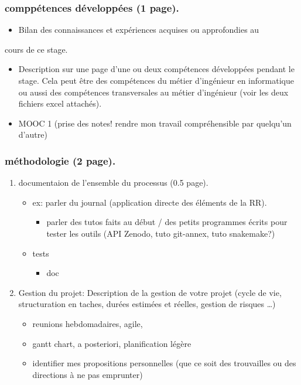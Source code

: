 \documentclass[11pt]{article}
\begin{document}
\subsubsection{comppétences développées (1 page).}
\label{sec:org7d59743}
\begin{itemize}
\item Bilan des connaissances et expériences acquises ou approfondies au
\end{itemize}
cours de ce stage.
\begin{itemize}
\item Description sur une page d'une ou deux compétences développées
pendant le stage. Cela peut être des compétences du métier
d'ingénieur en informatique ou aussi des compétences
transversales au métier d'ingénieur (voir les deux fichiers excel
attachés).
\item MOOC 1 (prise des notes! rendre mon travail compréhensible par
quelqu'un d'autre)
\end{itemize}

\subsubsection{méthodologie (2 page).}
\label{sec:orga69acbe}
\begin{enumerate}
\item documentaion de l'ensemble du processus (0.5 page).
\label{sec:orgefa5e29}
\begin{itemize}
\item ex: parler du journal (application directe des éléments de la RR).

\begin{itemize}
\item parler des tutos faits au début / des petits programmes écrits
pour tester les outils (API Zenodo, tuto git-annex, tuto
snakemake?)
\end{itemize}
\item tests
\begin{itemize}
\item doc
\end{itemize}
\end{itemize}
\item Gestion du projet:
\label{sec:org8f03be2}
Description de la gestion de votre projet
     (cycle de vie, structuration en taches, durées estimées et
     réelles, gestion de risques …)
\begin{itemize}
\item reunions hebdomadaires, agile,
\item gantt chart, a posteriori, planification légère
\item identifier mes propositions personnelles (que ce soit des
trouvailles ou des directions à ne pas emprunter)
\end{itemize}
\end{enumerate}
\end{document}
